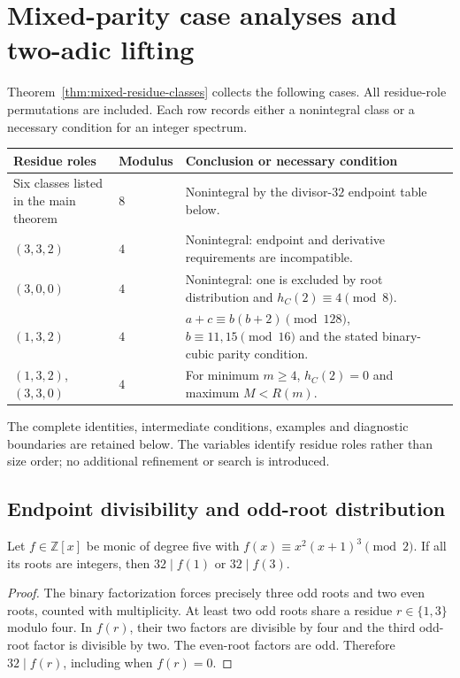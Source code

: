 \section{Mixed-parity case analyses and two-adic lifting}
\label{sec:two-adic-lifting}

Theorem~\ref{thm:mixed-residue-classes} collects the following cases.
All residue-role permutations are included. Each row records either a
nonintegral class or a necessary condition for an integer spectrum.
\begin{center}
\begin{tabular}{p{3.2cm}p{1.6cm}p{8.8cm}}
\toprule
Residue roles & Modulus & Conclusion or necessary condition\\
\midrule
Six classes listed in the main theorem & $8$ & Nonintegral by the divisor-$32$ endpoint table below.\\
$(3,3,2)$ & $4$ & Nonintegral: endpoint and derivative requirements are incompatible.\\
$(3,0,0)$ & $4$ & Nonintegral: one is excluded by root distribution and $h_C(2)\equiv4\pmod8$.\\
$(1,3,2)$ & $4$ & $a+c\equiv b(b+2)\pmod{128}$, $b\equiv11,15\pmod{16}$ and the stated binary-cubic parity condition.\\
$(1,3,2)$, $(3,3,0)$ & $4$ & For minimum $m\geq4$, $h_C(2)=0$ and maximum $M<R(m)$.\\
\bottomrule
\end{tabular}
\end{center}

The complete identities, intermediate conditions, examples and diagnostic
boundaries are retained below. The variables identify residue roles rather
than size order; no additional refinement or search is introduced.

\subsection{Endpoint divisibility and odd-root distribution}

\begin{lemma}
\label{lem:three-odd-roots}
Let $f\in\mathbb Z[x]$ be monic of degree five with
$f(x)\equiv x^2(x+1)^3\pmod2$. If all its roots are integers,
then $32\mid f(1)$ or $32\mid f(3)$.
\end{lemma}

\begin{proof}
The binary factorization forces precisely three odd roots and two even
roots, counted with multiplicity. At least two odd roots share a residue
$r\in\{1,3\}$ modulo four. In $f(r)$, their two factors are divisible
by four and the third odd-root factor is divisible by two. The even-root
factors are odd. Therefore $32\mid f(r)$, including when $f(r)=0$.
\end{proof}


